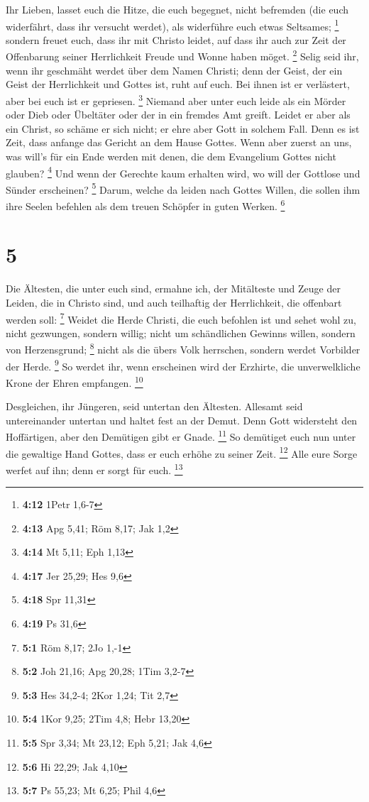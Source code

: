  Ihr Lieben, lasset euch die Hitze, die euch begegnet,
nicht befremden (die euch widerfährt, dass ihr versucht werdet), als
widerführe euch etwas Seltsames; \footnote{\textbf{4:12} 1Petr 1,6-7}
 sondern freuet euch, dass ihr mit Christo leidet, auf
dass ihr auch zur Zeit der Offenbarung seiner Herrlichkeit Freude und
Wonne haben möget. \footnote{\textbf{4:13} Apg 5,41; Röm 8,17; Jak 1,2}
 Selig seid ihr, wenn ihr geschmäht werdet über dem Namen
Christi; denn der Geist, der ein Geist der Herrlichkeit und Gottes ist,
ruht auf euch. Bei ihnen ist er verlästert, aber bei euch ist er
gepriesen. \footnote{\textbf{4:14} Mt 5,11; Eph 1,13} 
Niemand aber unter euch leide als ein Mörder oder Dieb oder Übeltäter
oder der in ein fremdes Amt greift.  Leidet er aber als
ein Christ, so schäme er sich nicht; er ehre aber Gott in solchem Fall.
 Denn es ist Zeit, dass anfange das Gericht an dem Hause
Gottes. Wenn aber zuerst an uns, was will's für ein Ende werden mit
denen, die dem Evangelium Gottes nicht glauben? \footnote{\textbf{4:17}
  Jer 25,29; Hes 9,6}  Und wenn der Gerechte kaum
erhalten wird, wo will der Gottlose und Sünder erscheinen? \footnote{\textbf{4:18}
  Spr 11,31}  Darum, welche da leiden nach Gottes Willen,
die sollen ihm ihre Seelen befehlen als dem treuen Schöpfer in guten
Werken. \footnote{\textbf{4:19} Ps 31,6}

\hypertarget{section-3}{%
\section{5}\label{section-3}}

 Die Ältesten, die unter euch sind, ermahne ich, der
Mitälteste und Zeuge der Leiden, die in Christo sind, und auch
teilhaftig der Herrlichkeit, die offenbart werden soll: \footnote{\textbf{5:1}
  Röm 8,17; 2Jo 1,-1}  Weidet die Herde Christi, die euch
befohlen ist und sehet wohl zu, nicht gezwungen, sondern willig; nicht
um schändlichen Gewinns willen, sondern von Herzensgrund; \footnote{\textbf{5:2}
  Joh 21,16; Apg 20,28; 1Tim 3,2-7}  nicht als die übers
Volk herrschen, sondern werdet Vorbilder der Herde. \footnote{\textbf{5:3}
  Hes 34,2-4; 2Kor 1,24; Tit 2,7}  So werdet ihr, wenn
erscheinen wird der Erzhirte, die unverwelkliche Krone der Ehren
empfangen. \footnote{\textbf{5:4} 1Kor 9,25; 2Tim 4,8; Hebr 13,20}

 Desgleichen, ihr Jüngeren, seid untertan den Ältesten.
Allesamt seid untereinander untertan und haltet fest an der Demut. Denn
Gott widersteht den Hoffärtigen, aber den Demütigen gibt er Gnade.
\footnote{\textbf{5:5} Spr 3,34; Mt 23,12; Eph 5,21; Jak 4,6}
 So demütiget euch nun unter die gewaltige Hand Gottes,
dass er euch erhöhe zu seiner Zeit. \footnote{\textbf{5:6} Hi 22,29; Jak
  4,10}  Alle eure Sorge werfet auf ihn; denn er sorgt für
euch. \footnote{\textbf{5:7} Ps 55,23; Mt 6,25; Phil 4,6}

